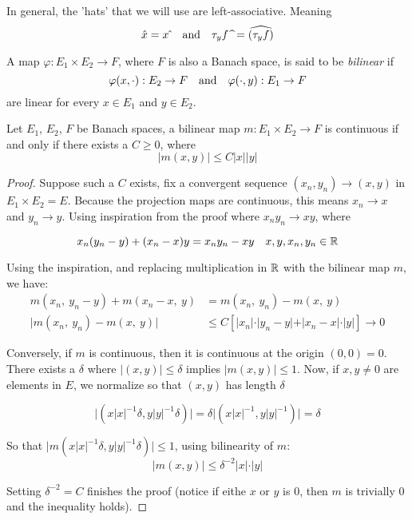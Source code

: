 \documentclass[../main-manifolds.tex]{subfiles}
\begin{document}
%
%
In general, the 'hats' that we will use are left-associative. Meaning 
\[
    \hat{x} = x\hat{\:}\qqtext{and} \tau_y f\:\widehat{\:} = \widehat{(\tau_y f)}
\]
%

%
%
%

\newpage
{}
\begin{definition}
A map $\varphi: E_1\times E_2\to F$, where $F$ is also a Banach space, is said to be \emph{bilinear} if
\[
    \varphi(x,\cdot): E_2\to F\qqtext{and}\varphi(\cdot,y): E_1\to F
\]
are linear for every $x\in E_1$ and $y\in E_2$.     
\end{definition}


\begin{wts}\label{prop:characterization-of-continuity-bilinear-map}
    Let $E_1$, $E_2$, $F$ be Banach spaces, a bilinear map $m: E_1\times E_2\to F$ is continuous if and only if there exists a $C\geq 0$, where
    \begin{equation}\label{eq:continuity-bilinear-map}
        \vert m(x,y)\vert\leq C\vert x\vert\vert y\vert    
    \end{equation}
\end{wts}
\begin{proof}
    Suppose such a $C$ exists, fix a convergent sequence $(x_n, y_n)\to (x,y)$ in $E_1\times E_2 = E$. Because the projection maps are continuous, this means $x_n\to x$ and $y_n\to y$. Using inspiration from the proof where $x_ny_n\to xy$, where

    \[
        x_n(y_n-y) + (x_n-x)y = x_ny_n- xy\quad x,y,x_n,y_n\in\mathbb{R}
    \]

    Using the inspiration, and replacing multiplication in $\mathbb{R}$ with the bilinear map $m$, we have:
    \begin{align*}
        m(x_n,\: y_n-y) + m(x_n-x,\: y) &= m(x_n,\:y_n) - m(x,\:y)\\
        \vert m(x_n,\: y_n) - m(x,\: y)\vert &\leq C[\vert x_n\vert\cdot\vert y_n - y\vert + \vert x_n - x\vert\cdot\vert y\vert]\to 0
    \end{align*}

    Conversely, if $m$ is continuous, then it is continuous at the origin $(0,0)=0$. There exists a $\delta$ where $\vert (x,y)\vert \leq \delta$ implies $\vert m(x,y)\vert \leq 1$. Now, if $x,y\neq 0$ are elements in $E$, we normalize so that $(x,y)$ has length $\delta$

    \[
        \vert(x\vert x\vert^{-1}\delta,y\vert y\vert^{-1}\delta)\vert = \delta\vert(x\vert x\vert^{-1},y\vert y\vert^{-1})\vert = \delta
    \]

    So that $\vert m(x\vert x\vert^{-1}\delta, y\vert y\vert^{-1}\delta)\vert \leq 1$, using bilinearity of $m$:
    \[
        \vert m(x,y)\vert\leq \delta^{-2}\vert x\vert\cdot\vert y\vert
    \]

    Setting $\delta^{-2} = C$ finishes the proof (notice if eithe $x$ or $y$ is $0$, then $m$ is trivially $0$ and the inequality holds).
\end{proof}
\end{document}
